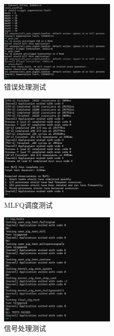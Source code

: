\begin{figure}[htbp]
    \centering
    \includegraphics[width=0.5\textwidth]{../image/wrong.png}
    \caption{错误处理测试}
    \label{fig:wrong}
\end{figure}

\begin{figure}[htbp]
    \centering
    \includegraphics[width=0.5\textwidth]{../image/mlfq.png}
    \caption{MLFQ调度测试}
    \label{fig:mlfq}
\end{figure}

\begin{figure}[htbp]
    \centering
    \includegraphics[width=0.5\textwidth]{../image/sig.png}
    \caption{信号处理测试}
    \label{fig:sig}
\end{figure}